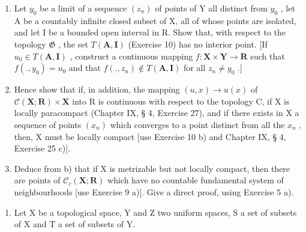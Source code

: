 \begin{enumerate}
\def\labelenumi{\alph{enumi})}
\item
  Let \(y_0\) be a limit of a sequence \((z_n)\) of points of Y all distinct from \(y_0\) , let A be a countably infinite closed subset of X, all of whose points are isolated, and let I be a bounded open interval in R. Show that, with respect to the topology \(\mathfrak{G}\) , the set \(T(\mathbf{A}, \mathbf{I})\) (Exercise 10) has no interior point. {[}If \(u_0 \in T(\mathbf{A}, \mathbf{I})\) , construct a continuous mapping \(f: \mathbf{X} \times \mathbf{Y} \to \mathbf{R}\) such that \(f(., y_0) = u_0\) and that \(f(., z_n) \notin T(\mathbf{A}, \mathbf{I})\) for all \(z_n \neq y_0\) .{]}
\item
  Hence show that if, in addition, the mapping \((u, x) \to u(x)\) of \(\mathcal{C}(\mathbf{X}; \mathbf{R}) \times \mathbf{X}\) into R is continuous with respect to the topology C, if X is locally paracompact (Chapter IX, § 4, Exercise 27), and if there exists in X a sequence of points \((x_{n})\) which converges to a point distinct from all the \(x_{n}\) , then, X must be locally compact {[}use Exercise 10 b) and Chapter IX, § 4, Exercise 25 c){]}.
\item
  Deduce from b) that if X is metrizable but not locally compact, then there are points of \(\mathcal{C}_{c}(\mathbf{X};\mathbf{R})\) which have no countable fundamental system of neighbourhoods {[}use Exercise 9 a){]}. Give a direct proof, using Exercise 5 a).
\end{enumerate}

\begin{enumerate}
\def\labelenumi{\arabic{enumi})}
\setcounter{enumi}{11}
\tightlist
\item
  Let X be a topological space, Y and Z two uniform spaces, S a set of subsets of X and T a set of subsets of Y.
\end{enumerate}

